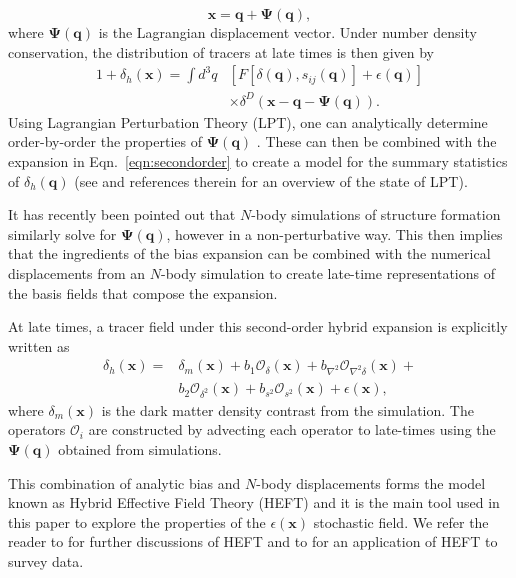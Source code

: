 \documentclass[fleqn,usenatbib]{mnras}
\newcommand{\bq}{\boldsymbol q}
\newcommand{\bx}{\boldsymbol x}
\newcommand{\bPsi}{\boldsymbol{\Psi}}
\begin{document}
\begin{equation}
    \bx = \bq + \bPsi (\bq),
\end{equation}
where $\bPsi(\bq)$ is the Lagrangian displacement vector. Under number density conservation, the distribution of tracers at late times is then given by 
\begin{align}
    1 + \delta_h (\bx) = \int d^3 q &\left [ F [\delta (\bq), s_{ij}(\bq)] + \epsilon (\bq)\right ] \\
    \nonumber &\times \delta^D \left ( \bx - \bq - \bPsi (\bq) \right ).
\end{align}
Using Lagrangian Perturbation Theory (LPT), one can analytically determine order-by-order the properties of $\bPsi(\bq)$ \citep{Matsubara_2008, Carlson_2012}. These can then be combined with the expansion in Eqn.~\ref{eqn:secondorder} to create a model for the summary statistics of $\delta_h(\bq)$ (see \citealt{Chen_2020, Chen_2021} and references therein for an overview of the state of LPT). \par 
It has recently been pointed out \citep{modichenwhite19} that $N$-body simulations of structure formation similarly solve for $\bPsi(\bq)$, however in a non-perturbative way. This then implies that the ingredients of the bias expansion can be combined with the numerical displacements from an $N$-body simulation to create late-time representations of the basis fields that compose the expansion. \par 
At late times, a tracer field under this second-order hybrid expansion is explicitly written as 
\begin{align}
    \label{eqn:latetime}
    \delta_{h} (\bx) =& \delta_m(\bx) + b_1 \mathcal{O}_\delta (\bx) + b_{\nabla^2} \mathcal{O}_{\nabla^2 \delta} (\bx) + \\
    &b_2 \mathcal{O}_{\delta^2} (\bx) + b_{s^2} \mathcal{O}_{s^2} (\bx) + \epsilon (\bx),
\end{align}
where $\delta_m(\bx)$ is the dark matter density contrast from the simulation. The operators $\mathcal{O}_i$ are constructed by advecting each operator to late-times using the $\bPsi(\bq)$ obtained from simulations. 
\par
This combination of analytic bias and $N$-body displacements forms the model known as Hybrid Effective Field Theory (HEFT) and it is the main tool used in this paper to explore the properties of the $\epsilon (\bx)$ stochastic field. We refer the reader to \citet{modichenwhite19, Kokron_2021, zennaro2021bacco} for further discussions of HEFT and to \citet{hadzhiyska2021hefty} for an application of HEFT to survey data. \par 
\end{document}
